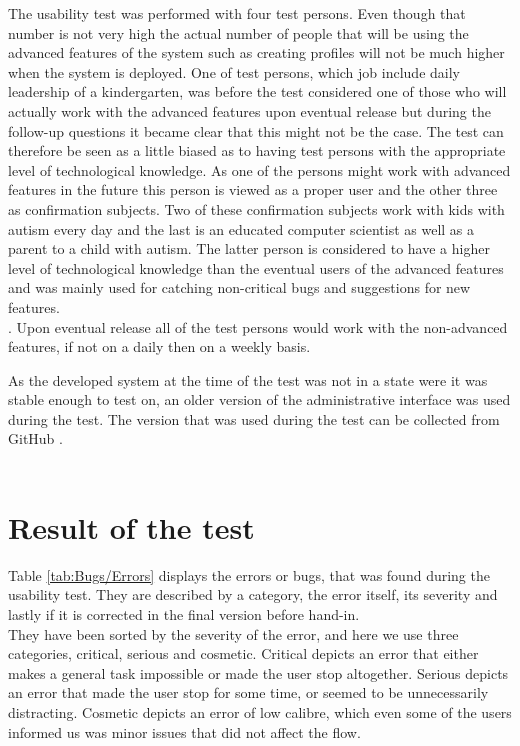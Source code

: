 The usability test was performed with four test persons. Even though that number is not very high the actual number of people that will be using the advanced features of the system such as creating profiles will not be much higher when the system is deployed. One of test persons, which job include daily leadership of a kindergarten, was before the test considered one of those who will actually work with the advanced features upon eventual release but during the follow-up questions it became clear that this might not be the case. The test can therefore be seen as a little biased as to having test persons with the appropriate level of technological knowledge. As one of the persons might work with advanced features in the future this person is viewed as a proper user and the other three as confirmation subjects. Two of these confirmation subjects work with kids with autism every day and the last is an educated computer scientist as well as a parent to a child with autism. The latter person is considered to have a higher level of technological knowledge than the eventual users of the advanced features and was mainly used for catching non-critical bugs and suggestions for new features.\\. Upon eventual release all of the test persons would work with the non-advanced features, if not on a daily then on a weekly basis.

As the developed system at the time of the test was not in a state were it was stable enough to test on, an older version of the administrative interface was used during the test. The version that was used during the test can be collected from GitHub \citep{testBranch}.\\
\\

\section{Result of the test}
Table \ref{tab:Bugs/Errors} displays the errors or bugs, that was found during the usability test. They are described by a category, the error itself, its severity and lastly if it is corrected in the final version before hand-in.\\
They have been sorted by the severity of the error, and here we use three categories, critical, serious and cosmetic. Critical depicts an error that either makes a general task impossible or made the user stop altogether. Serious depicts an error that made the user stop for some time, or seemed to be unnecessarily distracting. Cosmetic depicts an error of low calibre, which even some of the users informed us was minor issues that did not affect the flow.\\
\\

